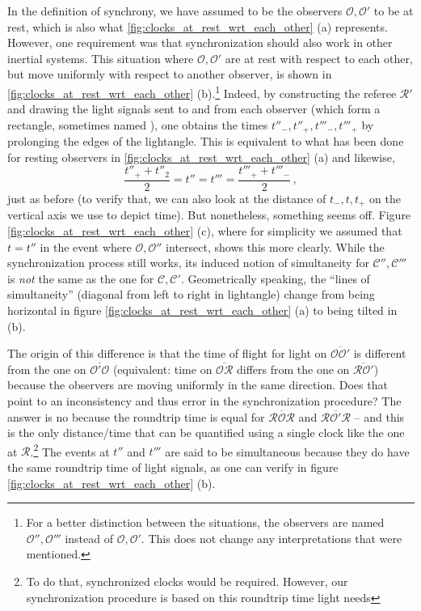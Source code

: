 In the definition of synchrony, we have assumed to be the observers $\mathcal{O}, \mathcal{O}'$ to be at rest, which is also what \ref{fig:clocks_at_rest_wrt_each_other} (a) represents. However, one requirement was that synchronization should also work in other inertial systems. This situation where $\mathcal{O}, \mathcal{O}'$ are at rest with respect to each other, but move uniformly with respect to another observer, is shown in \ref{fig:clocks_at_rest_wrt_each_other} (b).\footnote{For a better distinction between the situations, the observers are named $\mathcal{O}'', \mathcal{O}'''$ instead of $\mathcal{O}, \mathcal{O}'$. This does not change any interpretations that were mentioned.} Indeed, by constructing the referee $\mathcal{R}'$ and drawing the light signals sent to and from each observer (which form a rectangle, sometimes named ), one obtains the times $t''_-, t''_+, t'''_-, t'''_+$ by prolonging the edges of the lightangle. This is equivalent to what has been done for resting observers in \ref{fig:clocks_at_rest_wrt_each_other} (a) and likewise,
\begin{equation}
\frac{t''_+ + t''_2}{2} = t'' = t''' = \frac{t'''_+ + t'''_-}{2} \, ,
\end{equation}
just as before (to verify that, we can also look at the distance of $t_-, t, t_+$ on the vertical axis we use to depict time). But nonetheless, something seems off. Figure \ref{fig:clocks_at_rest_wrt_each_other} (c), where for simplicity we assumed that $t = t''$ in the event where $\mathcal{O}, \mathcal{O}''$ intersect, shows this more clearly. While the synchronization process still works, its induced notion of simultaneity for $\mathcal{C}'', \mathcal{C}'''$ is \emph{not} the same as the one for $\mathcal{C}, \mathcal{C}'$. Geometrically speaking, the \enquote{lines of simultaneity} (diagonal from left to right in lightangle) change from being horizontal in figure \ref{fig:clocks_at_rest_wrt_each_other} (a) to being tilted in (b).


The origin of this difference is that the time of flight for light on $\overline{\mathcal{O} \mathcal{O}'}$ is different from the one on $\overline{\mathcal{O}' \mathcal{O}}$ (equivalent: time on $\overline{\mathcal{O} \mathcal{R}}$ differs from the one on $\overline{\mathcal{R} \mathcal{O}'}$) because the observers are moving uniformly in the same direction. Does that point to an inconsistency and thus error in the synchronization procedure? The answer is no because the roundtrip time is equal for $\overline{\mathcal{R} \mathcal{O} \mathcal{R}}$ and $\overline{\mathcal{R} \mathcal{O}' \mathcal{R}}$ -- and this is the only distance/time that can be quantified using a single clock like the one at $\mathcal{R}$.\footnote{To do that, synchronized clocks would be required. However, our synchronization procedure is based on this roundtrip time light needs } The events at $t''$ and $t'''$ are said to be simultaneous because they do have the same roundtrip time of light signals, as one can verify in figure \ref{fig:clocks_at_rest_wrt_each_other} (b).



